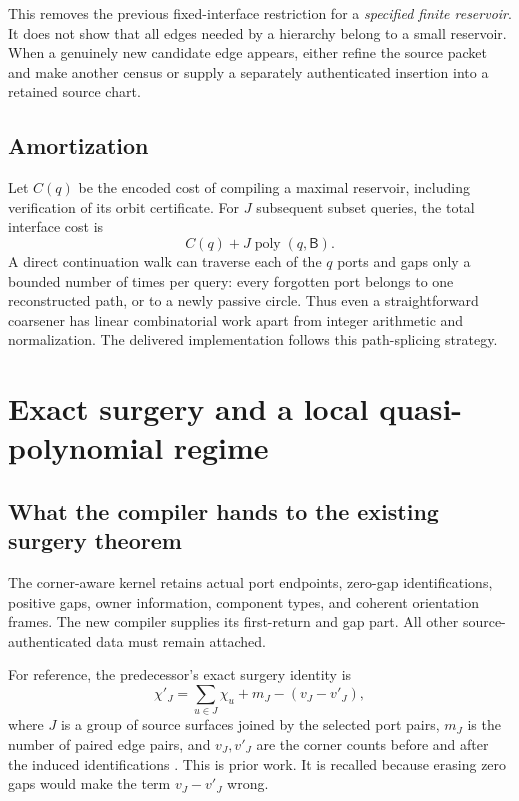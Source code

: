 \documentclass[11pt]{article}
\theoremstyle{definition}\newtheorem{definition}[theorem]{Definition}\newtheorem{example}[theorem]{Example}
\theoremstyle{remark}\newtheorem{remark}[theorem]{Remark}
\newcommand{\poly}{\operatorname{poly}}
\newcommand{\bits}{\mathsf B}
\begin{document}
This removes the previous fixed-interface restriction for a \emph{specified finite reservoir}. It does not show that all edges needed by a hierarchy belong to a small reservoir. When a genuinely new candidate edge appears, either refine the source packet and make another census or supply a separately authenticated insertion into a retained source chart.

\subsection{Amortization}
Let $C(q)$ be the encoded cost of compiling a maximal reservoir, including verification of its orbit certificate. For $J$ subsequent subset queries, the total interface cost is
\begin{equation}\label{eq:amortize}
                              C(q)+J\poly(q,\bits).
\end{equation}
A direct continuation walk can traverse each of the $q$ ports and gaps only a bounded number of times per query: every forgotten port belongs to one reconstructed path, or to a newly passive circle. Thus even a straightforward coarsener has linear combinatorial work apart from integer arithmetic and normalization. The delivered implementation follows this path-splicing strategy.

\section{Exact surgery and a local quasi-polynomial regime}
\label{sec:search}
\subsection{What the compiler hands to the existing surgery theorem}
The corner-aware kernel retains actual port endpoints, zero-gap identifications, positive gaps, owner information, component types, and coherent orientation frames. The new compiler supplies its first-return and gap part. All other source-authenticated data must remain attached.

For reference, the predecessor's exact surgery identity is
\begin{equation}\label{eq:euler}
                \chi'_J=\sum_{u\in J}\chi_u+m_J-(v_J-v'_J),
\end{equation}
where $J$ is a group of source surfaces joined by the selected port pairs, $m_J$ is the number of paired edge pairs, and $v_J,v'_J$ are the corner counts before and after the induced identifications \cite{corner}. This is prior work. It is recalled because erasing zero gaps would make the term $v_J-v'_J$ wrong.
\end{document}
